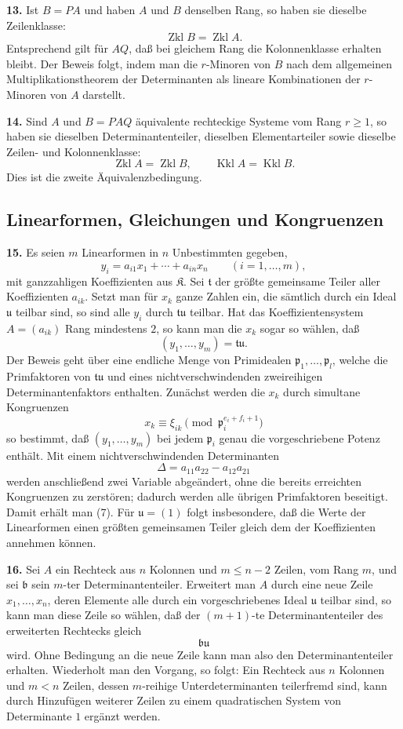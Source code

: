\documentclass[11pt,a4paper]{article}
\newcommand{\K}{\mathfrak K}
\newcommand{\Zkl}{\operatorname{Zkl}}
\newcommand{\Kkl}{\operatorname{Kkl}}
\begin{document}
\textbf{13.} Ist \(B=PA\) und haben \(A\) und \(B\) denselben Rang, so haben sie dieselbe Zeilenklasse:
\[
 \Zkl B=\Zkl A.
\]
Entsprechend gilt für \(AQ\), daß bei gleichem Rang die Kolonnenklasse erhalten bleibt. Der Beweis folgt, indem man die \(r\)-Minoren von \(B\) nach dem allgemeinen Multiplikationstheorem der Determinanten als lineare Kombinationen der \(r\)-Minoren von \(A\) darstellt.

\textbf{14.} Sind \(A\) und \(B=PAQ\) äquivalente rechteckige Systeme vom Rang \(r\geq1\), so haben sie dieselben Determinantenteiler, dieselben Elementarteiler sowie dieselbe Zeilen- und Kolonnenklasse:
\[
 \Zkl A=\Zkl B,\qquad \Kkl A=\Kkl B. \tag{5}
\]
Dies ist die zweite Äquivalenzbedingung.

\subsection*{Linearformen, Gleichungen und Kongruenzen}

\textbf{15.} Es seien \(m\) Linearformen in \(n\) Unbestimmten gegeben,
\[
 y_i=a_{i1}x_1+\cdots+a_{in}x_n\qquad(i=1,\ldots,m), \tag{6}
\]
mit ganzzahligen Koeffizienten aus \(\K\). Sei \(\mathfrak t\) der größte gemeinsame Teiler aller Koeffizienten \(a_{ik}\). Setzt man für \(x_k\) ganze Zahlen ein, die sämtlich durch ein Ideal \(\mathfrak u\) teilbar sind, so sind alle \(y_i\) durch \(\mathfrak t\mathfrak u\) teilbar. Hat das Koeffizientensystem \(A=(a_{ik})\) Rang mindestens \(2\), so kann man die \(x_k\) sogar so wählen, daß
\[
 (y_1,\ldots,y_m)=\mathfrak t\mathfrak u. \tag{7}
\]
Der Beweis geht über eine endliche Menge von Primidealen \(\mathfrak p_1,\ldots,\mathfrak p_l\), welche die Primfaktoren von \(\mathfrak t\mathfrak u\) und eines nichtverschwindenden zweireihigen Determinantenfaktors enthalten. Zunächst werden die \(x_k\) durch simultane Kongruenzen
\[
 x_k\equiv \xi_{ik}\pmod{\mathfrak p_i^{e_i+f_i+1}}
\]
so bestimmt, daß \((y_1,\ldots,y_m)\) bei jedem \(\mathfrak p_i\) genau die vorgeschriebene Potenz enthält. Mit einem nichtverschwindenden Determinanten
\[
 \Delta=a_{11}a_{22}-a_{12}a_{21}
\]
werden anschließend zwei Variable abgeändert, ohne die bereits erreichten Kongruenzen zu zerstören; dadurch werden alle übrigen Primfaktoren beseitigt. Damit erhält man (7). Für \(\mathfrak u=(1)\) folgt insbesondere, daß die Werte der Linearformen einen größten gemeinsamen Teiler gleich dem der Koeffizienten annehmen können.

\textbf{16.} Sei \(A\) ein Rechteck aus \(n\) Kolonnen und \(m\leq n-2\) Zeilen, vom Rang \(m\), und sei \(\mathfrak b\) sein \(m\)-ter Determinantenteiler. Erweitert man \(A\) durch eine neue Zeile \(x_1,\ldots,x_n\), deren Elemente alle durch ein vorgeschriebenes Ideal \(\mathfrak u\) teilbar sind, so kann man diese Zeile so wählen, daß der \((m+1)\)-te Determinantenteiler des erweiterten Rechtecks gleich
\[
 \mathfrak b\mathfrak u
\]
wird. Ohne Bedingung an die neue Zeile kann man also den Determinantenteiler erhalten. Wiederholt man den Vorgang, so folgt: Ein Rechteck aus \(n\) Kolonnen und \(m<n\) Zeilen, dessen \(m\)-reihige Unterdeterminanten teilerfremd sind, kann durch Hinzufügen weiterer Zeilen zu einem quadratischen System von Determinante \(1\) ergänzt werden.
\end{document}
